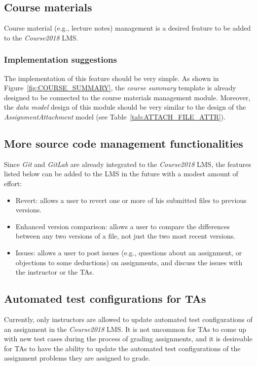 \subsection{Course materials}
Course material (e.g., lecture notes) management is a desired feature to be
added to the \emph{Course2018} LMS.

\subsubsection{Implementation suggestions}
The implementation of this feature should be very simple.
As shown in
Figure~\ref{fig:COURSE_SUMMARY}, the \emph{course summary} template is already
designed to be connected to the course materials management module.
Moreover, the \emph{data model} design of this module should
be very similar to the design of the \emph{AssignmentAttachment} model 
(see Table~\ref{tab:ATTACH_FILE_ATTR}).

\subsection{More source code management functionalities}
Since \emph{Git} and \emph{GitLab} are already integrated to the
\emph{Course2018} LMS, the features listed below can be added to the LMS in the
future with a modest amount of effort:
\begin{itemize}
    \item Revert: allows a user to revert one or more of his submitted files to
        previous versions.
    \item Enhanced version comparison: allows a user to compare the differences
        between any two versions of a file, not just the two most recent
        versions.
    \item Issues: allows a user to post issues (e.g., questions about an
        assignment, or objections to some deductions) on assignments, and
        discuss the issues with the instructor or the TAs.
\end{itemize}

\subsection{Automated test configurations for TAs}
Currently, only instructors are allowed to update automated test
configurations of an assignment in the \emph{Course2018} LMS.
It is not uncommon for TAs to come up with new test
cases during the process of grading assignments, and it is desireable for TAs
to have the ability to update the automated test configurations of the
assignment problems they are assigned to grade.


